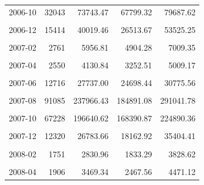 \begin{longtable}[t]{crrrr}
2006-10 & 32043 & 73743.47 & 67799.32 & 79687.62\\
\cellcolor{gray!10}{2006-11} & \cellcolor{gray!10}{29302} & \cellcolor{gray!10}{73652.21} & \cellcolor{gray!10}{59165.76} & \cellcolor{gray!10}{88138.67}\\
2006-12 & 15414 & 40019.46 & 26513.67 & 53525.25\\
\cellcolor{gray!10}{2007-01} & \cellcolor{gray!10}{4220} & \cellcolor{gray!10}{9078.06} & \cellcolor{gray!10}{6923.55} & \cellcolor{gray!10}{11232.57}\\
2007-02 & 2761 & 5956.81 & 4904.28 & 7009.35\\
\cellcolor{gray!10}{2007-03} & \cellcolor{gray!10}{3340} & \cellcolor{gray!10}{8659.72} & \cellcolor{gray!10}{7248.22} & \cellcolor{gray!10}{10071.22}\\
2007-04 & 2550 & 4130.84 & 3252.51 & 5009.17\\
\cellcolor{gray!10}{2007-05} & \cellcolor{gray!10}{5123} & \cellcolor{gray!10}{9650.27} & \cellcolor{gray!10}{8903.23} & \cellcolor{gray!10}{10397.32}\\
2007-06 & 12716 & 27737.00 & 24698.44 & 30775.56\\
\cellcolor{gray!10}{2007-07} & \cellcolor{gray!10}{19931} & \cellcolor{gray!10}{25857.90} & \cellcolor{gray!10}{21559.83} & \cellcolor{gray!10}{30155.98}\\
2007-08 & 91085 & 237966.43 & 184891.08 & 291041.78\\
\cellcolor{gray!10}{2007-09} & \cellcolor{gray!10}{141220} & \cellcolor{gray!10}{475231.40} & \cellcolor{gray!10}{421121.08} & \cellcolor{gray!10}{529341.71}\\
2007-10 & 67228 & 196640.62 & 168390.87 & 224890.36\\
\cellcolor{gray!10}{2007-11} & \cellcolor{gray!10}{31421} & \cellcolor{gray!10}{81782.29} & \cellcolor{gray!10}{64876.44} & \cellcolor{gray!10}{98688.14}\\
2007-12 & 12320 & 26783.66 & 18162.92 & 35404.41\\
\cellcolor{gray!10}{2008-01} & \cellcolor{gray!10}{2777} & \cellcolor{gray!10}{3632.01} & \cellcolor{gray!10}{1881.98} & \cellcolor{gray!10}{5382.04}\\
2008-02 & 1751 & 2830.96 & 1833.29 & 3828.62\\
\cellcolor{gray!10}{2008-03} & \cellcolor{gray!10}{1887} & \cellcolor{gray!10}{1971.15} & \cellcolor{gray!10}{259.13} & \cellcolor{gray!10}{3683.18}\\
2008-04 & 1906 & 3469.34 & 2467.56 & 4471.12\\

\end{longtable}
